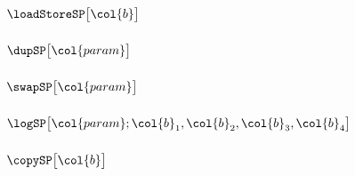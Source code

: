 \subsubsection{\oneOneSP{}                                                                        \lispDone{}}  \label{hub: stack patterns: 1_1}              
\subsubsection{\twoOneSP{}                                                                        \lispDone{}}  \label{hub: stack patterns: 2_1}              
\subsubsection{\threeOneSP{}                                                                      \lispDone{}}  \label{hub: stack patterns: 3_1}              
\subsubsection{$\loadStoreSP\big[\col{b}\big]$                                                    \lispDone{}}  \label{hub: stack patterns: load store}       
\subsubsection{$\dupSP\big[\col{param}\big]$                                                      \lispDone{}}  \label{hub: stack patterns: dup}              
\subsubsection{$\swapSP\big[\col{param}\big]$                                                     \lispDone{}}  \label{hub: stack patterns: swap}             
\subsubsection{$\logSP\big[\col{param}; \col{b}_{1}, \col{b}_{2}, \col{b}_{3}, \col{b}_{4} \big]$ \lispDone{}}  \label{hub: stack patterns: log}              
\subsubsection{$\copySP\big[\col{b}\big]$                                                         \lispDone{}}  \label{hub: stack patterns: copy}             
